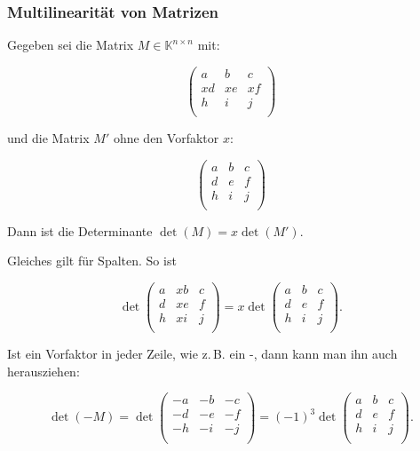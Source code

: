 \documentclass{scrartcl}
\begin{document}
\subsubsection{Multilinearität von Matrizen}

Gegeben sei die Matrix $M \in \mathbb{K}^{n\times n}$ mit:

\begin{equation}
	\begin{pmatrix*}
		a & b & c \\
		xd & xe & xf \\
		h & i & j \\
	\end{pmatrix*}
\end{equation}

und die Matrix $M'$ ohne den Vorfaktor $x$:

\begin{equation}
	\begin{pmatrix*}
		a & b & c \\
		d & e & f \\
		h & i & j \\
	\end{pmatrix*}
\end{equation}

Dann ist die Determinante $\det(M) = x \det(M')$.

Gleiches gilt für Spalten. So ist

\begin{equation}
	\det\begin{pmatrix*}
		a & xb & c \\
		d & xe & f \\
		h & xi & j \\
	\end{pmatrix*} = x\det\begin{pmatrix*}
		a & b & c \\
		d & e & f \\
		h & i & j \\
	\end{pmatrix*}.
\end{equation}

Ist ein Vorfaktor in jeder Zeile, wie z.\,B. ein \frq -\flq, dann kann man ihn auch \frq herausziehen\flq:

\begin{equation}
	\det(-M) = \det\begin{pmatrix*}
		-a & -b & -c \\
		-d & -e & -f \\
		-h & -i & -j \\
	\end{pmatrix*} = (-1)^3 \det\begin{pmatrix*}
		a & b & c \\
		d & e & f \\
		h & i & j \\
	\end{pmatrix*}.
\end{equation}
\end{document}
